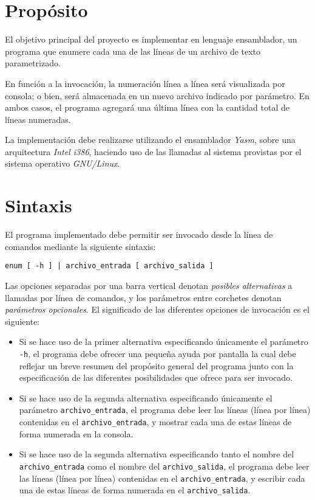 \documentclass[12pt,a4paper]{article}
\begin{document}

\section*{Propósito}
El objetivo principal del proyecto es implementar en lenguaje ensamblador, un programa que enumere cada una de las líneas de un archivo de texto parametrizado.

En función a la invocación, la numeración línea a línea será visualizada por consola; o bien, será almacenada en un nuevo archivo indicado por parámetro. En ambos casos, el programa agregará una última línea con la cantidad total de líneas numeradas.

La implementación debe realizarse utilizando el ensamblador \textit{Yasm}, sobre una arquitectura \textit{Intel i386}, haciendo uso de las llamadas al sistema provistas por el sistema operativo \textit{GNU/Linux}.

\section*{Sintaxis}
El programa implementado debe permitir ser invocado desde la línea de comandos mediante la siguiente sintaxis:
\begin{center}
	\texttt{enum [ -h ] | archivo\_entrada [ archivo\_salida ]}
\end{center}

Las opciones separadas por una barra vertical denotan \textit{posibles alternativas} a llamadas por línea de comandos, y los parámetros entre corchetes denotan \textit{parámetros opcionales}. El significado de las diferentes opciones de invocación es el siguiente:
\begin{itemize}
	\item Si se hace uso de la primer alternativa especificando únicamente el parámetro \texttt{-h}, el programa debe ofrecer una pequeña ayuda por pantalla la cual debe reflejar un breve resumen del propósito general del programa junto con la especificación de las diferentes posibilidades que ofrece para ser invocado.
	\item Si se hace uso de la segunda alternativa especificando únicamente el parámetro \texttt{archivo\_entrada}, el programa debe leer las líneas (línea por línea) contenidas en el \texttt{archivo\_entrada}, y mostrar cada una de estas líneas de forma numerada en la consola. 
	\item Si se hace uso de la segunda alternativa especificando tanto el nombre del \texttt{archivo\_entrada} como el nombre del \texttt{archivo\_salida}, el programa debe leer las líneas (línea por línea) contenidas en el \texttt{archivo\_entrada}, y escribir cada una de estas líneas de forma numerada en el \texttt{archivo\_salida}.
\end{itemize}
	
\end{document}
